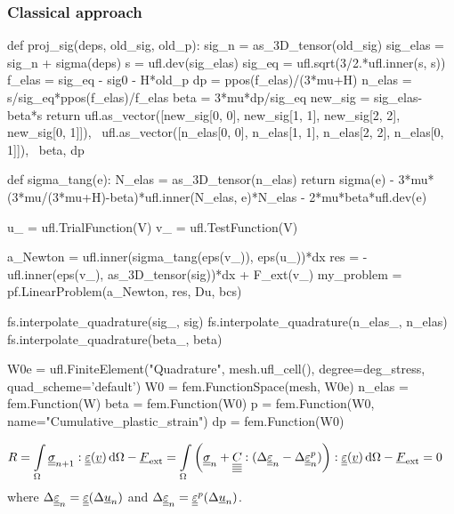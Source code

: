 \documentclass[12pt]{article}
\newcommand{\todounderline}[1]{\todo[inline, size=\scriptsize]{#1}}
\begin{document}
\subsubsection{Classical approach}
\todounderline{Complete this section}

\begin{pythoncode}
    def proj_sig(deps, old_sig, old_p):
        sig_n = as_3D_tensor(old_sig)
        sig_elas = sig_n + sigma(deps)
        s = ufl.dev(sig_elas)
        sig_eq = ufl.sqrt(3/2.*ufl.inner(s, s))
        f_elas = sig_eq - sig0 - H*old_p
        dp = ppos(f_elas)/(3*mu+H)
        n_elas = s/sig_eq*ppos(f_elas)/f_elas
        beta = 3*mu*dp/sig_eq
        new_sig = sig_elas-beta*s
        return ufl.as_vector([new_sig[0, 0], new_sig[1, 1], new_sig[2, 2], new_sig[0, 1]]), \
            ufl.as_vector([n_elas[0, 0], n_elas[1, 1], n_elas[2, 2], n_elas[0, 1]]), \
            beta, dp       

    def sigma_tang(e):
        N_elas = as_3D_tensor(n_elas)
        return sigma(e) - 3*mu*(3*mu/(3*mu+H)-beta)*ufl.inner(N_elas, e)*N_elas - 2*mu*beta*ufl.dev(e)  
\end{pythoncode}

\begin{pythoncode}
    u_ = ufl.TrialFunction(V)
    v_ = ufl.TestFunction(V)

    a_Newton = ufl.inner(sigma_tang(eps(v_)), eps(u_))*dx
    res = -ufl.inner(eps(v_), as_3D_tensor(sig))*dx + F_ext(v_)
    my_problem = pf.LinearProblem(a_Newton, res, Du, bcs)
\end{pythoncode}

\begin{pythoncode}
    fs.interpolate_quadrature(sig_, sig)
    fs.interpolate_quadrature(n_elas_, n_elas)
    fs.interpolate_quadrature(beta_, beta)
\end{pythoncode}

\begin{pythoncode}
    W0e = ufl.FiniteElement("Quadrature", mesh.ufl_cell(), degree=deg_stress, quad_scheme='default')
    W0 = fem.FunctionSpace(mesh, W0e)
    n_elas = fem.Function(W)
    beta = fem.Function(W0)
    p = fem.Function(W0, name="Cumulative_plastic_strain")
    dp = fem.Function(W0)
\end{pythoncode}

\begin{align}
    & R = \int\limits_\Omega \underline{\underline{\sigma}}_{n+1} : \underline{\underline{\varepsilon}}(\underline{v}) \, \mathrm{d}\Omega - \underline{F}_\text{ext} = \int\limits_\Omega \left( \underline{\underline{\sigma}}_n + \underline{\underline{\underline{\underline{C_{}}}}} : (\Delta \underline{\underline{\varepsilon}}_{n} - \Delta \underline{\underline{\varepsilon}}_{n}^p) \right) : \underline{\underline{\varepsilon}}(\underline{v}) \, \mathrm{d}\Omega - \underline{F}_\text{ext} = 0
\end{align}
where $\Delta \underline{\underline{\varepsilon}}_{n} = \underline{\underline{\varepsilon}}(\Delta\underline{u}_n)$ and $\Delta \underline{\underline{\varepsilon}}_{n} = \underline{\underline{\varepsilon}}^p(\Delta\underline{u}_n)$.
\end{document}
